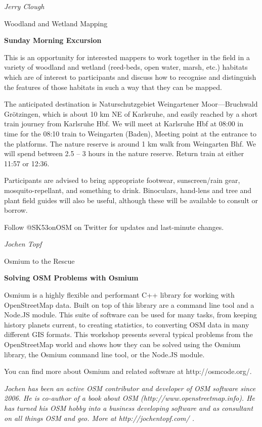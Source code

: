 \newcommand{\sundayabstract}[7]%
{%
\newpage%
\ifthispageodd{\ThisCenterWallPaper{1.0}{sunday_r}}{\ThisCenterWallPaper{1.0}{sunday_l}}
\renewcommand{\talktime}{#1}
\renewcommand{\talkroom}{#2}
\thispagestyle{scrheadings}
\noindent \emph{#3}%
\vspace{0.75em}
{\par\noindent\large \sectfont #4}%
\vspace*{0.35em}%
{\par\noindent\bfseries \normalsize \sectfont #5}
\vspace{1em}
\par\noindent #7 \par%
\vspace*{0.35em}%
{\em{#6}}%
\cropmarkswallpaper%
}


\sundayabstract{8:00}{Amalienstraße}{Jerry Clough}{Woodland and Wetland Mapping}%
{Sunday Morning Excursion}%
{}%
{This is an opportunity for interested mappers to work together in the
field in a variety of woodland and wetland (reed-beds, open water, marsh, etc.) habitats which are of interest to participants and discuss how to recognise and distinguish the features of those habitats in such a way that they can be mapped. 

The anticipated destination is Naturschutzgebiet Weingartener Moor---Bruchwald Grötzingen, which is about 10 km NE of Karlsruhe, and easily reached by a short train journey from Karlsruhe Hbf. We will meet at Karlsruhe Hbf at 08:00 in time for the 08:10 train to Weingarten (Baden), Meeting point at the entrance to the platforms. The nature reserve is around 1 km walk from Weingarten Bhf. We will spend between 2.5 – 3 hours in the nature reserve. Return train at either 11:57 or 12:36.

Participants are advised to bring appropriate footwear, sunscreen/rain gear, mosquito-repellant, and something to drink. Binoculars, hand-lens and tree and plant field guides will also be useful, although these will be available to consult or borrow.

Follow @SK53onOSM on Twitter for updates and last-minute changes.
}

\sundayabstract{10:00}{Amalienstraße}{Jochen Topf}{Osmium to the Rescue}%
{Solving OSM Problems with Osmium}%
{Jochen has been an active OSM contributor and developer of OSM software since 2006. He is co-author of a book about OSM (http://www.openstreetmap.info). He has turned his OSM hobby into a business developing software and as consultant on all things OSM and geo. More at http://jochentopf.com/ . }%
{Osmium is a highly flexible and performant C++ library for working with OpenStreetMap data. Built on top of this library are a command line tool and a Node.JS module. This suite of software can be used for many tasks, from keeping history planets current, to creating statistics, to converting OSM data in many different GIS formats. This workshop presents several typical problems from the OpenStreetMap world and shows how they can be solved using the Osmium library, the Osmium command line tool, or the Node.JS module. 

You can find more about Osmium and related software at http://osmcode.org/. }

